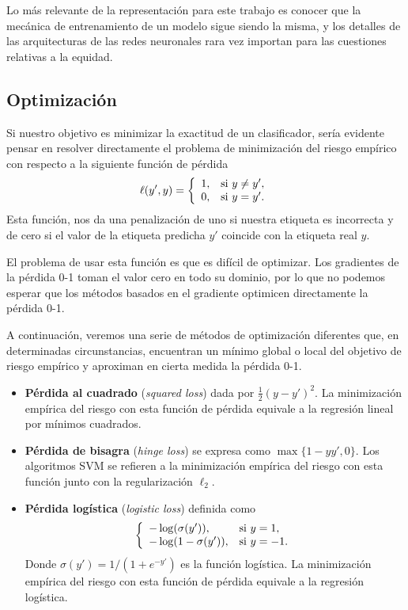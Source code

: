 \documentclass[oneside,openright,titlepage,numbers=noenddot,openany,headinclude,footinclude=true,
cleardoublepage=empty,abstractoff,BCOR=5mm,paper=a4,fontsize=12pt,main=spanish]{scrreprt}
\begin{document}
Lo más relevante de la representación para este trabajo es conocer que la mecánica de entrenamiento de un modelo sigue siendo la misma, y los detalles de las arquitecturas de las redes neuronales rara vez importan para las cuestiones relativas a la equidad. %


\subsection{Optimización}

Si nuestro objetivo es minimizar la exactitud de un clasificador, sería evidente pensar en resolver directamente el problema de minimización del riesgo empírico con respecto a la siguiente función de pérdida $$\ell(y',y)=\left \{
\begin{array}{l l}
1, & \mbox{si } y\neq y', \\
0, & \mbox{si } y=y'.
\end{array}
\right.$$ Esta función, nos da una penalización de uno si nuestra etiqueta es incorrecta y de cero si el valor de la etiqueta predicha $y'$ coincide con la etiqueta real $y$.

El problema de usar esta función es que es difícil de optimizar. Los gradientes de la pérdida 0-1 toman el valor cero en todo su dominio, por lo que no podemos esperar que los métodos basados en el gradiente optimicen directamente la pérdida 0-1.

A continuación, veremos una serie de métodos de optimización diferentes que, en determinadas circunstancias, encuentran un mínimo global o local del objetivo de riesgo empírico y aproximan en cierta medida la pérdida 0-1.

\begin{itemize}
    \item \textbf{Pérdida al cuadrado} (\textit{squared loss}) dada por $\frac{1}{2}(y-y')^2$. La minimización empírica del riesgo con esta función de pérdida equivale a la regresión lineal por mínimos cuadrados. 
    \item \textbf{Pérdida de bisagra} (\textit{hinge loss}) se expresa como $\max\{1-yy',0\}$. Los algoritmos SVM se refieren a la minimización empírica del riesgo con esta función junto con la regularización $\ell_2$.
    \item \textbf{Pérdida logística} (\textit{logistic loss}) definida como $$\left \{
    \begin{array}{l l}
    -\log(\sigma(y')), & \mbox{si } y=1, \\
    -\log(1-\sigma(y')), & \mbox{si } y=-1.
    \end{array}
    \right.$$
    Donde $\sigma(y')=1/(1+e^{-y'})$ es la función logística. La minimización empírica del riesgo con esta función de pérdida equivale a la regresión logística. 
\end{itemize}
\end{document}
